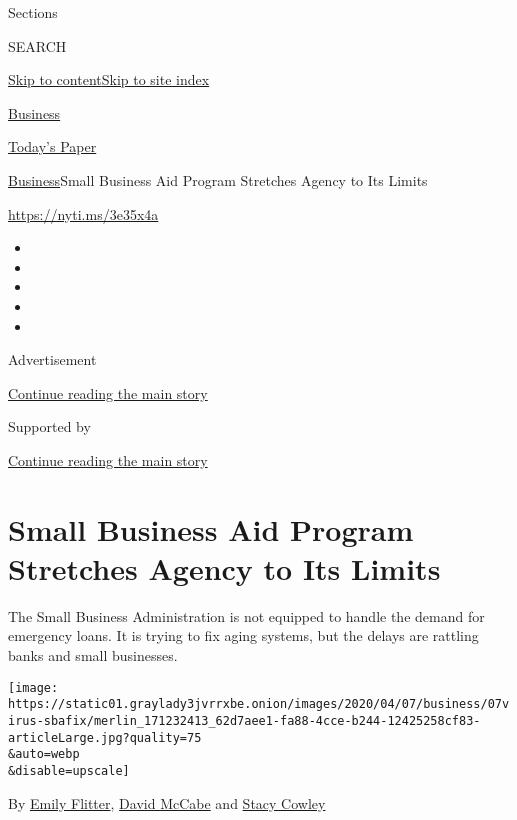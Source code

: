 Sections

SEARCH

\protect\hyperlink{site-content}{Skip to
content}\protect\hyperlink{site-index}{Skip to site index}

\href{https://www.nytimes3xbfgragh.onion/section/business}{Business}

\href{https://myaccount.nytimes3xbfgragh.onion/auth/login?response_type=cookie\&client_id=vi}{}

\href{https://www.nytimes3xbfgragh.onion/section/todayspaper}{Today's
Paper}

\href{/section/business}{Business}\textbar{}Small Business Aid Program
Stretches Agency to Its Limits

\url{https://nyti.ms/3e35x4a}

\begin{itemize}
\item
\item
\item
\item
\item
\end{itemize}

Advertisement

\protect\hyperlink{after-top}{Continue reading the main story}

Supported by

\protect\hyperlink{after-sponsor}{Continue reading the main story}

\hypertarget{small-business-aid-program-stretches-agency-to-its-limits}{%
\section{Small Business Aid Program Stretches Agency to Its
Limits}\label{small-business-aid-program-stretches-agency-to-its-limits}}

The Small Business Administration is not equipped to handle the demand
for emergency loans. It is trying to fix aging systems, but the delays
are rattling banks and small businesses.

\texttt{[image: https://static01.graylady3jvrrxbe.onion/images/2020/04/07/business/07virus-sbafix/merlin\_171232413\_62d7aee1-fa88-4cce-b244-12425258cf83-articleLarge.jpg?quality=75\\\&auto=webp\\\&disable=upscale]}

By \href{https://www.nytimes3xbfgragh.onion/by/emily-flitter}{Emily
Flitter},
\href{https://www.nytimes3xbfgragh.onion/by/david-mccabe}{David McCabe}
and \href{https://www.nytimes3xbfgragh.onion/by/stacy-cowley}{Stacy
Cowley}

